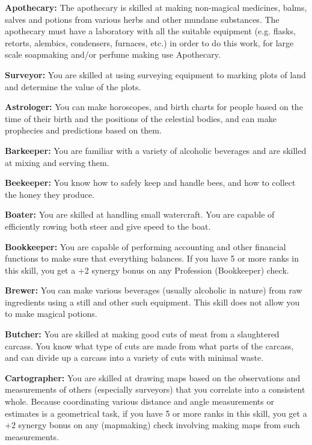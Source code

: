 \begin{itemize*}
	\item \textbf{Apothecary:} The apothecary is skilled at making non-magical medicines, balms, salves and potions from various herbs and other mundane substances. The apothecary must have a laboratory with all the suitable equipment (e.g. flasks, retorts, alembics, condensers, furnaces, etc.) in order to do this work, for large scale soapmaking and/or perfume making use Apothecary.
	\item \textbf{Surveyor:} You are skilled at using surveying equipment to marking plots of land and determine the value of the plots.
	\item\textbf{Astrologer:} You can make horoscopes, and birth charts for people based on the time of their birth and the positions of the celestial bodies, and can make prophecies and predictions based on them.
	\item \textbf{Barkeeper:} You are familiar with a variety of alcoholic beverages and are skilled at mixing and serving them.
	\item\textbf{Beekeeper:} You know how to safely keep and handle bees, and how to collect the honey they produce.
	\item \textbf{Boater:} You are skilled at handling small watercraft. You are capable of efficiently rowing both steer and give speed to the boat.
	\item \textbf{Bookkeeper:} You are capable of performing accounting and other financial functions to make sure that everything balances. If you have 5 or more ranks in this skill, you get a +2 synergy bonus on any Profession (Bookkeeper) check.
	\item \textbf{Brewer:} You can make various beverages (usually alcoholic in nature) from raw ingredients using a still and other such equipment. This skill does not allow you to make magical potions.
	\item \textbf{Butcher:} You are skilled at making good cuts of meat from a slaughtered carcass. You know what type of cuts are made from what parts of the carcass, and can divide up a carcass into a variety of cuts with minimal waste.
	\item \textbf{Cartographer:} You are skilled at drawing maps based on the observations and measurements of others (especially surveyors) that you correlate into a consistent whole. Because coordinating various distance and angle measurements or estimates is a geometrical task, if you have 5 or more ranks in this skill, you get a +2 synergy bonus on any  (mapmaking) check involving making maps from such measurements.

\end{itemize*}
